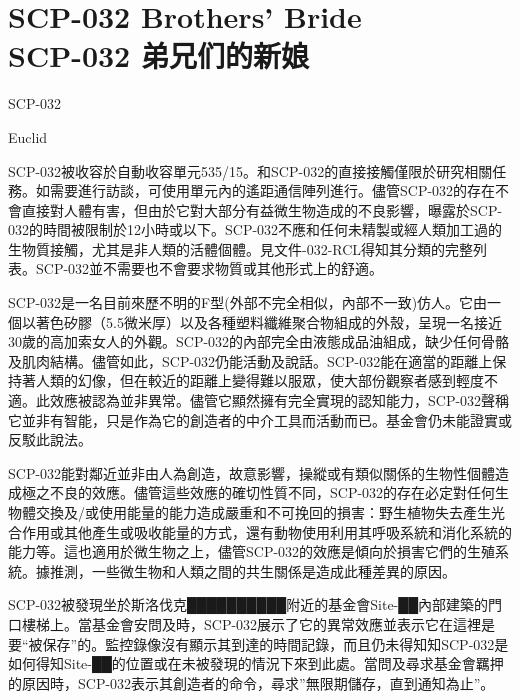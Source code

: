\chapter[SCP-032 弟兄们的新娘]{
    SCP-032 Brothers' Bride\\
    SCP-032 弟兄们的新娘
}

\label{chap:SCP-032}

SCP-032

Euclid

SCP-032被收容於自動收容單元535\slash 15。和SCP-032的直接接觸僅限於研究相關任務。如需要進行訪談，可使用單元內的遙距通信陣列進行。儘管SCP-032的存在不會直接對人體有害，但由於它對大部分有益微生物造成的不良影響，曝露於SCP-032的時間被限制於12小時或以下。SCP-032不應和任何未精製或經人類加工過的生物質接觸，尤其是非人類的活體個體。見文件-032-RCL得知其分類的完整列表。SCP-032並不需要也不會要求物質或其他形式上的舒適。

SCP-032是一名目前來歷不明的F型(外部不完全相似，內部不一致)仿人。它由一個以著色矽膠（5.5微米厚）以及各種塑料纖維聚合物組成的外殼，呈現一名接近30歲的高加索女人的外觀。SCP-032的內部完全由液態成品油組成，缺少任何骨骼及肌肉結構。儘管如此，SCP-032仍能活動及說話。SCP-032能在適當的距離上保持著人類的幻像，但在較近的距離上變得難以服眾，使大部份觀察者感到輕度不適。此效應被認為並非異常。儘管它顯然擁有完全實現的認知能力，SCP-032聲稱它並非有智能，只是作為它的創造者的中介工具而活動而已。基金會仍未能證實或反駁此說法。

SCP-032能對鄰近並非由人為創造，故意影響，操縱或有類似關係的生物性個體造成極之不良的效應。儘管這些效應的確切性質不同，SCP-032的存在必定對任何生物體交換及\slash 或使用能量的能力造成嚴重和不可挽回的損害：野生植物失去產生光合作用或其他產生或吸收能量的方式，還有動物使用利用其呼吸系統和消化系統的能力等。這也適用於微生物之上，儘管SCP-032的效應是傾向於損害它們的生殖系統。據推測，一些微生物和人類之間的共生關係是造成此種差異的原因。

SCP-032被發現坐於斯洛伐克██████████附近的基金會Site-██內部建築的門口樓梯上。當基金會安問及時，SCP-032展示了它的異常效應並表示它在這裡是要“被保存”的。監控錄像沒有顯示其到達的時間記錄，而且仍未得知知SCP-032是如何得知Site-██的位置或在未被發現的情況下來到此處。當問及尋求基金會羈押的原因時，SCP-032表示其創造者的命令，尋求”無限期儲存，直到通知為止”。




